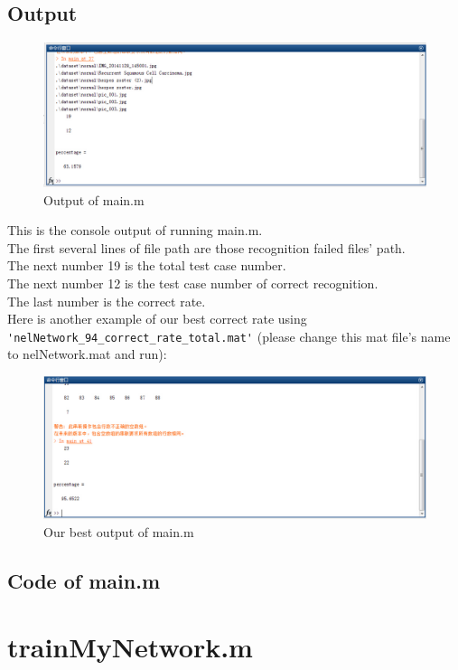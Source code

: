 \documentclass[14pt]{report} %
\begin{document}
\subsection{Output}
	\begin{figure}[H]
		\includegraphics[width=\textwidth]{image/resultoftest.jpg} 
		\caption{Output of main.m} 
		 \label{fig:Outputofmain} 
	\end{figure}
	This is the console output of running main.m.
	\\The first several lines of file path are those recognition failed files' path.
	\\The next number 19 is the total test case number.
	\\The next number 12 is the test case number of correct recognition.
	\\The last number is the correct rate.
	\\Here is another example of our best correct rate using \verb|'nelNetwork_94_correct_rate_total.mat'| (please change this mat file's name to nelNetwork.mat and run):
	\begin{figure}[H]
		\includegraphics[width=\textwidth]{image/resultoftestbest.jpg} 
		\caption{Our best output of main.m} 
		 \label{fig:Outputbest} 
	\end{figure}
\subsection{Code of main.m}


\clearpage
\section{trainMyNetwork.m}
\label{section:trainMyNetwork.m}
\end{document}
